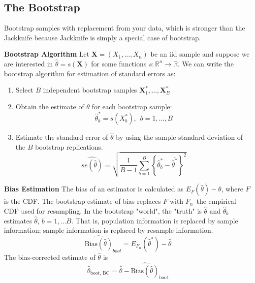 \documentclass[12pt]{article}
\newcommand{\Bias}{\text{Bias}}
\numberwithin{equation}{section}
\begin{document}
\subsection{The Bootstrap}
Bootstrap samples with replacement from your data, which is stronger than the Jackknife because Jackknife is simply a special case of bootstrap. 

\textbf{Bootstrap Algorithm}
Let $\bm{X} = (X_1, \ldots, X_n)$ be an iid sample and suppose we are interested in $\hat{\theta} = s(\bm{X})$ for some functions $s : \mathbb{R}^n \to \mathbb{R}$. We can write the bootstrap algorithm for estimation of standard errors as:
\begin{enumerate}
  \item Select $B$ independent bootstrap samples
    $\bm{X}_1^*, \ldots, \bm{X}_B^*$
  \item Obtain the estimate of $\theta$ for each bootstrap sample:
  \begin{equation*}
    \hat{\theta}_b^* = s(X_b^*), \ \ b = 1, \ldots, B
  \end{equation*}
  \item Estimate the standard error of $\hat{\theta}$ by using the sample standard deviation of the $B$ bootstrap replications.
  \begin{equation*}
    \widehat{se(\hat{\theta})} = \sqrt{ \frac{1}{B-1}
    \sum_{b = 1}^B \left\{ \hat{\theta}_b^* - \bar{\widehat{\theta}^*} \right\} ^2
    }
  \end{equation*}
\end{enumerate}

\textbf{Bias Estimation}
The bias of an estimator is calculated as $E_{F}(\hat{\theta}) - \theta$, where $F$ is the CDF. The bootstrap estimate of bias replaces $F$ with $F_n$--the empirical CDF used for resampling. In the bootstrap "world", the "truth" is $\hat{\theta}$ and $\hat{\theta}_b$ estimates $\hat{\theta}$, $b = 1, \ldots B$. That is, population information is replaced by sample information;
sample information is replaced by resample information.
%
\begin{equation*}
  \widehat{\Bias(\widehat{\theta})}_{boot} = E_{F_n}(\hat{\theta}^*) - \hat{\theta}
\end{equation*}
%
The bias-corrected estimate of $\hat{\theta}$ is 
\begin{equation*}
  \hat{\theta}_{\text{boot, BC}} = \hat{\theta} - \widehat{\Bias(\hat{\theta})}_{\text{boot}}
\end{equation*}
\end{document}

